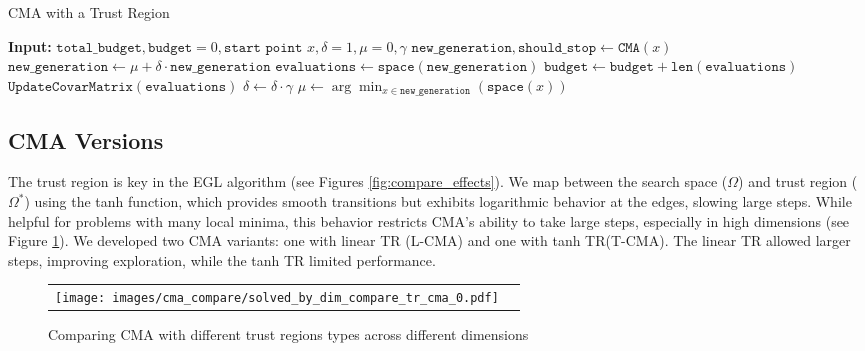 \begin{algorithm}[tb]
   \caption{CMA with a Trust Region}
   \label{CMA_TR_ALG}
\begin{algorithmic}
   \STATE \textbf{Input:} $\texttt{total\_budget}, \texttt{budget} = 0, \texttt{start point } x, \delta = 1, \mu = 0, \gamma$
      \STATE $\texttt{new\_generation}, \texttt{should\_stop} \gets \texttt{CMA}(x)$
      \STATE $\texttt{new\_generation} \gets \mu + \delta \cdot \texttt{new\_generation}$
      \STATE $\texttt{evaluations} \gets \texttt{space}(\texttt{new\_generation})$
      \STATE $\texttt{budget} \gets \texttt{budget} + \texttt{len}(\texttt{evaluations})$
      \STATE $\texttt{UpdateCovarMatrix}(\texttt{evaluations})$
         \STATE $\delta \gets \delta \cdot \gamma$
         \STATE $\mu \gets \arg\min_{x \in \texttt{new\_generation}}(\texttt{space}(x))$
      \ENDIF
   \ENDWHILE
\end{algorithmic}
\end{algorithm}


\subsection{CMA Versions}
The trust region is key in the EGL algorithm (see Figures \ref{fig:compare_effects}). We map between the search space ($\Omega$) and trust region ($\Omega^*$) using the tanh function, which provides smooth transitions but exhibits logarithmic behavior at the edges, slowing large steps. While helpful for problems with many local minima, this behavior restricts CMA’s ability to take large steps, especially in high dimensions (see Figure \ref{figure: cma_tr_dim_compare}). We developed two CMA variants: one with linear TR (L-CMA) and one with tanh TR(T-CMA). The linear TR allowed larger steps, improving exploration, while the tanh TR limited performance.

\begin{figure}
    \centering
    \begin{tabular}{cc}
    \texttt{[image: images/cma\_compare/solved\_by\_dim\_compare\_tr\_cma\_0.pdf]}\hfill &
    \end{tabular}
    \caption{Comparing CMA with different trust regions types across different dimensions}
    \label{figure: cma_tr_dim_compare}
\end{figure}



